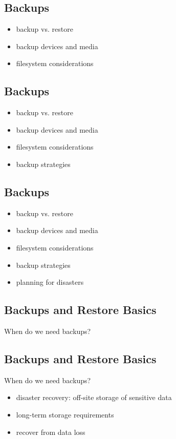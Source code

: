 \documentclass[xga]{xdvislides}
\begin{document}
\subsection{Backups}
\begin{itemize}
	\item backup vs. restore
	\item backup devices and media
	\item filesystem considerations
\end{itemize}

\subsection{Backups}
\begin{itemize}
	\item backup vs. restore
	\item backup devices and media
	\item filesystem considerations
	\item backup strategies
\end{itemize}

\subsection{Backups}
\begin{itemize}
	\item backup vs. restore
	\item backup devices and media
	\item filesystem considerations
	\item backup strategies
	\item planning for disasters
\end{itemize}

\subsection{Backups and Restore Basics}
When do we need backups?

\subsection{Backups and Restore Basics}
When do we need backups?
\begin{itemize}
	\item disaster recovery: off-site storage of sensitive data
	\item long-term storage requirements
	\item recover from data loss
\end{itemize}
\end{document}
